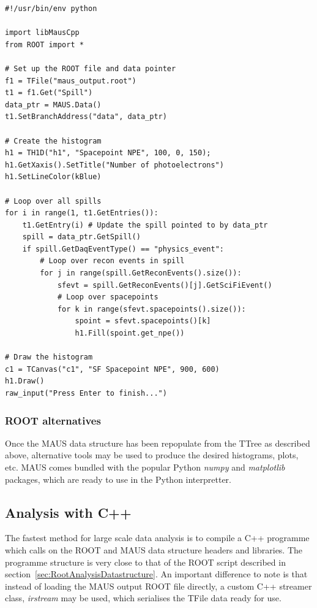 \documentclass[a4paper,10pt]{article}
\begin{document}
\lstset{style=custompy}

  \begin{lstlisting}
#!/usr/bin/env python

import libMausCpp
from ROOT import *

# Set up the ROOT file and data pointer
f1 = TFile("maus_output.root")
t1 = f1.Get("Spill")
data_ptr = MAUS.Data()
t1.SetBranchAddress("data", data_ptr)

# Create the histogram
h1 = TH1D("h1", "Spacepoint NPE", 100, 0, 150);
h1.GetXaxis().SetTitle("Number of photoelectrons")
h1.SetLineColor(kBlue)

# Loop over all spills
for i in range(1, t1.GetEntries()):
    t1.GetEntry(i) # Update the spill pointed to by data_ptr
    spill = data_ptr.GetSpill()
    if spill.GetDaqEventType() == "physics_event":
        # Loop over recon events in spill
        for j in range(spill.GetReconEvents().size()):
            sfevt = spill.GetReconEvents()[j].GetSciFiEvent()
            # Loop over spacepoints
            for k in range(sfevt.spacepoints().size()):
                spoint = sfevt.spacepoints()[k]
                h1.Fill(spoint.get_npe())

# Draw the histogram
c1 = TCanvas("c1", "SF Spacepoint NPE", 900, 600)
h1.Draw()
raw_input("Press Enter to finish...")
  \end{lstlisting}

  \subsubsection{ROOT alternatives}
  Once the MAUS data structure has been repopulate from the TTree as described above, alternative tools may be used to produce the desired histograms, plots, etc.  MAUS comes bundled with the popular Python \textit{numpy} and \textit{matplotlib} packages, which are ready to use in the Python interpretter.
  
  \subsection{Analysis with C++}
  \label{sec:C++Analysis}
  The fastest method for large scale data analysis is to compile a C++ programme which calls on the ROOT and MAUS data structure headers and libraries.  The programme structure is very close to that of the ROOT script described in section~\ref{sec:RootAnalysisDatastructure}. An important difference to note is that instead of loading the MAUS output ROOT file directly, a custom C++ streamer class, \textit{irstream} may be used, which serialises the TFile data ready for use.  
\end{document}
